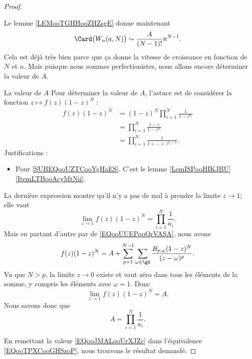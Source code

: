 \begin{proof}
\begin{subproof}
        Le lemme \ref{LEMooTGHHooZHZsgE} donne maintenant
        \begin{equation}        \label{EQooTPXCooGHSzoP}
            \Card\big( W_n(a,N) \big)\sim \frac{ A }{ (N-1)! }n^{N-1}.
        \end{equation}
        Cela est déjà très bien parce que ça donne la vitesse de croissance en fonction de \( N\) et \( n\). Mais puisque nous sommes perfectionistes, nous allons encore déterminer la valeur de \( A\).
    \item[La valeur de \( A\)]
        Pour déterminer la valeur de \( A\), l'astuce est de considérer la fonction \( z\mapsto f(z)(1-z)^N\) :
        \begin{subequations}
            \begin{align}
                f(z)(1-z)^N&=(1-z)^N\prod_{i=1}^N\frac{1}{ 1-z^{a_i} }\\
                &=\prod_{i=1}^N\frac{ 1-z }{ 1-z^{a_i} }\\
                &=\prod_{i=1}^N\frac{1}{ 1+\ldots +z^{a_i-1} }.      \label{SUBEQooUZTCooYgHaES}
            \end{align}
        \end{subequations}
        Justifications :
        \begin{itemize}
            \item Pour \eqref{SUBEQooUZTCooYgHaES}. C'est le lemme \ref{LemISPooHIKJBU}\ref{ItemLTBooAcyMtNii}.
        \end{itemize}
        La dernière expression montre qu'il n'y a pas de mal à prendre la limite \( z\to 1\); elle vaut
        \begin{equation}
            \lim_{z\to 1} f(z)(1-z)^N=\prod_{i=1}^N\frac{1}{ a_i }.
        \end{equation}
        Mais en partant d'autre par de \eqref{EQooUUEPooQrVASA}, nous avons
        \begin{equation}
            f(z)(1-z)^N=A+\sum_{p=1}^{N-1}\sum_{\omega\in \gU}\frac{ B_{p,\omega}(1-z)^N }{ (z-\omega)^p }.
        \end{equation}
        Vu que \( N>p\), la limite \( z\to 0\) existe et vaut zéro dans tous les éléments de la somme, y compris les éléments avec \( \omega=1\). Donc
        \begin{equation}
            \lim_{z\to 1}f(z)(1-z)^N=A.
        \end{equation}
        Nous savons donc que
        \begin{equation}        \label{EQooJMALooUrXJZc}
            A=\prod_{i=1}^N\frac{1}{ a_i }.
        \end{equation}
    \end{subproof}
    En remettant la valeur \eqref{EQooJMALooUrXJZc} dans l'équivalence \eqref{EQooTPXCooGHSzoP}, nous trouvons le résultat demandé.
\end{proof}

